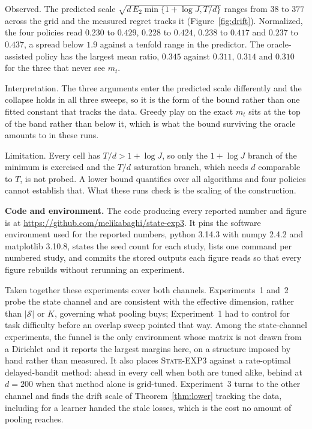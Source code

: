 \documentclass{article}
\theoremstyle{remark}
\newcommand{\etwo}{E_2}
\newcommand{\Sset}{\mathcal{S}}
\newcommand{\repourl}{https://github.com/melikabaghi/state-exp3}
\begin{document}
Observed. The predicted scale $\sqrt{d\,\etwo\min\{1+\log J,T/d\}}$ ranges from $38$ to $377$
across the grid and the measured regret tracks it (Figure~\ref{fig:drift}). Normalized, the four
policies read $0.230$ to $0.429$, $0.228$ to $0.424$, $0.238$ to $0.417$ and $0.237$ to $0.437$,
a spread below $1.9$ against a tenfold range in the predictor. The oracle-assisted policy has the
largest mean ratio, $0.345$ against $0.311$, $0.314$ and $0.310$ for the three that never see
$m_t$.

Interpretation. The three arguments enter the predicted scale differently and the collapse holds
in all three sweeps, so it is the form of the bound rather than one fitted constant that tracks
the data. Greedy play on the exact $m_t$ sits at the top of the band rather than below it, which is what
the bound surviving the oracle amounts to in these runs.

Limitation. Every cell has $T/d>1+\log J$, so only the $1+\log J$ branch of the minimum is
exercised and the $T/d$ saturation branch, which needs $d$ comparable to $T$, is not probed. A
lower bound quantifies over all algorithms and four policies cannot establish that. What these
runs check is the scaling of the construction.

\textbf{Code and environment.} The code producing every reported number and figure is at
\expandafter\url\expandafter{\repourl}. It pins the software environment used for the reported
numbers, python 3.14.3 with numpy 2.4.2 and matplotlib 3.10.8, states the seed count for each
study, lists one command per numbered study, and commits the stored outputs each figure reads so
that every figure rebuilds without rerunning an experiment.

Taken together these experiments cover both channels. Experiments~1 and~2 probe the state channel
and are consistent with the effective dimension, rather than $|\Sset|$ or $K$, governing what
pooling buys; Experiment~1 had to control for task difficulty before an overlap sweep pointed that
way.
Among the state-channel experiments, the funnel is the only environment whose matrix is not
drawn from a Dirichlet and it reports the
largest margins here, on a structure imposed by hand rather than measured. It also places
\textsc{State-EXP3} against a rate-optimal delayed-bandit method: ahead in every cell when both are
tuned alike, behind at $d=200$ when that method alone is grid-tuned. Experiment~3 turns to the other
channel and finds the drift scale of Theorem~\ref{thm:lower} tracking the data, including for a
learner handed the stale losses, which is the cost no amount of pooling reaches.
\end{document}
